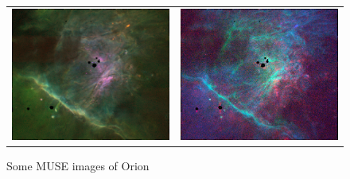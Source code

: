 \documentclass[preprint]{aastex}
\begin{document}
\begin{figure}
\begin{tabular}{@{}l@{}l@{}}
    \includegraphics{rgb-O1-S2-O2}
    & \includegraphics{rgb-C1-O1-N1} \\
  \end{tabular}
  \caption{Some MUSE images of Orion}
  \label{fig:MUSE-rgb}
\end{figure}
\end{document}
